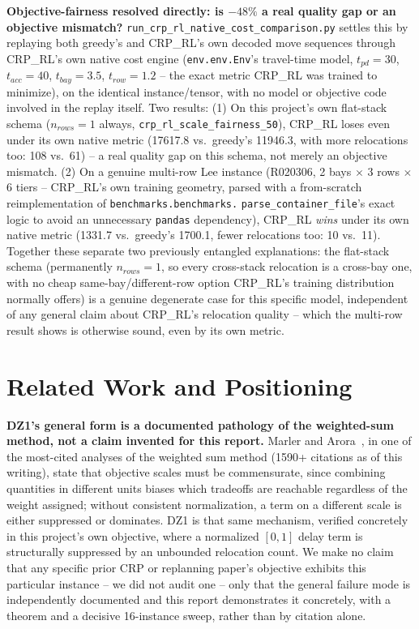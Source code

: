 \documentclass[11pt]{article}
\begin{document}
\textbf{Objective-fairness resolved directly: is $-48\%$ a real quality gap
or an objective mismatch?} \texttt{run\_crp\_rl\_native\_cost\_comparison.py}
settles this by replaying both greedy's and CRP\_RL's own decoded move
sequences through CRP\_RL's own native cost engine
(\texttt{env.env.Env}'s travel-time model, $t_{pd}{=}30$, $t_{acc}{=}40$,
$t_{bay}{=}3.5$, $t_{row}{=}1.2$ -- the exact metric CRP\_RL was trained to
minimize), on the identical instance/tensor, with no model or objective
code involved in the replay itself. Two results:
(1) On this project's own flat-stack schema ($n_{rows}{=}1$ always,
\texttt{crp\_rl\_scale\_fairness\_50}), CRP\_RL loses even under its own
native metric (17617.8 vs.\ greedy's 11946.3, with more relocations too:
108 vs.\ 61) -- a real quality gap on this schema, not merely an objective
mismatch. (2) On a genuine multi-row Lee instance (R020306, 2 bays
$\times$ 3 rows $\times$ 6 tiers -- CRP\_RL's own training geometry, parsed
with a from-scratch reimplementation of \texttt{benchmarks.benchmarks.}
\texttt{parse\_container\_file}'s exact logic to avoid an unnecessary
\texttt{pandas} dependency), CRP\_RL \emph{wins} under its own native
metric (1331.7 vs.\ greedy's 1700.1, fewer relocations too: 10 vs.\ 11).
Together these separate two previously entangled explanations: the
flat-stack schema (permanently $n_{rows}{=}1$, so every cross-stack
relocation is a cross-bay one, with no cheap same-bay/different-row option
CRP\_RL's training distribution normally offers) is a genuine degenerate
case for this specific model, independent of any general claim about
CRP\_RL's relocation quality -- which the multi-row result shows is
otherwise sound, even by its own metric.

\section{Related Work and Positioning}
\label{sec:related-work}

\textbf{DZ1's general form is a documented pathology of the weighted-sum
method, not a claim invented for this report.} Marler and
Arora~\cite{marler2010}, in one of the most-cited analyses of the weighted
sum method (1590+ citations as of this writing), state that objective
scales must be commensurate, since combining quantities in different units
biases which tradeoffs are reachable regardless of the weight assigned;
without consistent normalization, a term on a different scale is either
suppressed or dominates. DZ1 is that same mechanism, verified concretely in
this project's own objective, where a normalized $[0,1]$ delay term is
structurally suppressed by an unbounded relocation count. We make no claim
that any specific prior CRP or replanning paper's objective exhibits this
particular instance -- we did not audit one -- only that the general
failure mode is independently documented and this report demonstrates it
concretely, with a theorem and a decisive 16-instance sweep, rather than by
citation alone.
\end{document}
